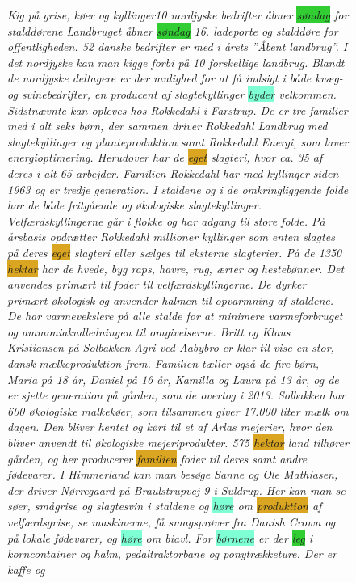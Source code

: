 \begin{figure}
	\begin{tcolorbox}
		\emph{
			Kig på grise, køer og kyllinger10 \colorbox{Peach}{nordjyske} bedrifter åbner \colorbox{LimeGreen}{søndag} for stalddørene Landbruget åbner \colorbox{LimeGreen}{søndag} 16.  ladeporte og stalddøre for offentligheden. 52 danske bedrifter er med i årets ”Åbent landbrug”. I det \colorbox{Peach}{nordjyske} kan man kigge forbi på 10 \colorbox{Peach}{forskellige} landbrug. Blandt de \colorbox{Peach}{nordjyske} deltagere er der \colorbox{Peach}{mulighed} for at få indsigt i både kvæg- og svinebedrifter,  en producent af slagtekyllinger \colorbox{Aquamarine}{byder} velkommen. Sidstnævnte kan opleves hos Rokkedahl i Farstrup. De er tre familier med i alt \colorbox{Peach}{seks} børn, der sammen driver Rokkedahl Landbrug med slagtekyllinger og planteproduktion \colorbox{Peach}{samt} Rokkedahl Energi, som laver energioptimering. Herudover har de \colorbox{Goldenrod}{eget} slagteri, hvor ca. 35 af deres i alt 65  arbejder. Familien Rokkedahl har  med kyllinger siden 1963 og er tredje generation. I staldene og i de omkringliggende folde har de både fritgående og økologiske slagtekyllinger. Velfærdskyllingerne går i flokke og har adgang til store folde. På årsbasis opdrætter Rokkedahl  \colorbox{Peach}{millioner} kyllinger som enten slagtes på deres \colorbox{Goldenrod}{eget} slagteri eller sælges til eksterne slagterier. På de 1350 \colorbox{Goldenrod}{hektar} har de hvede, byg raps, havre, rug, ærter og hestebønner. Det anvendes primært til foder til velfærdskyllingerne. De dyrker  primært økologisk og anvender halmen til opvarmning af staldene. De har varmevekslere på alle stalde for at minimere varmeforbruget og ammoniakudledningen til omgivelserne. Britt og Klaus Kristiansen på Solbakken Agri ved Aabybro er \colorbox{Peach}{klar} til vise en stor, \colorbox{Peach}{dansk} mælkeproduktion frem. Familien tæller også de fire børn, Maria på 18 år, Daniel på 16 år, Kamilla og Laura på 13 år, og de er sjette generation på gården, som de overtog i 2013. Solbakken har 600 økologiske malkekøer, som tilsammen \colorbox{Peach}{giver} 17.000 liter mælk om dagen. Den bliver hentet og kørt til et af Arlas mejerier, hvor den bliver anvendt til økologiske mejeriprodukter. 575 \colorbox{Goldenrod}{hektar} \colorbox{Peach}{land} tilhører gården, og her producerer \colorbox{Goldenrod}{familien} foder til deres  \colorbox{Peach}{samt} andre fødevarer.  I Himmerland kan man besøge Sanne og Ole Mathiasen, der driver Nørregaard på Braulstrupvej 9 i Suldrup. Her kan man se søer, smågrise og slagtesvin i staldene og \colorbox{Aquamarine}{høre} om \colorbox{Goldenrod}{produktion} af velfærdsgrise, se maskinerne, få smagsprøver fra Danish Crown og på \colorbox{Peach}{lokale} fødevarer, og \colorbox{Aquamarine}{høre} om biavl. For \colorbox{Aquamarine}{børnene} er der \colorbox{LimeGreen}{leg} i korncontainer og halm, pedaltraktorbane og ponytrækketure. Der er kaffe og }
\end{tcolorbox}
\end{figure}
